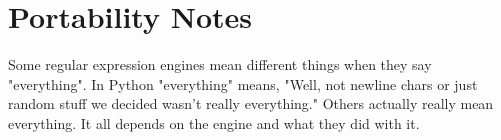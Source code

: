 \section{Portability Notes}

Some regular expression engines mean different things when they say "everything".
In Python "everything" means, "Well, not newline chars or just random stuff
we decided wasn't really everything."  Others actually really mean everything.
It all depends on the engine and what they did with it.

